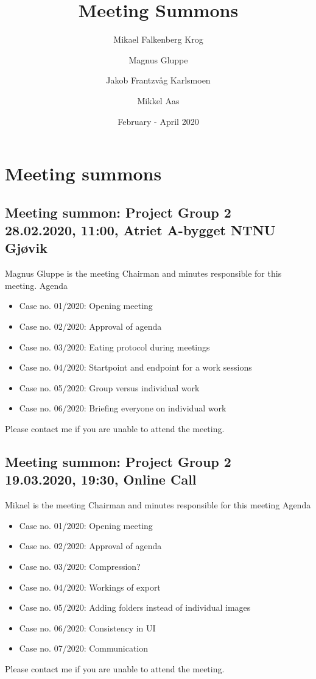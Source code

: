 \documentclass{article}
\title{Meeting Summons}
\author{Mikael Falkenberg Krog \and Magnus Gluppe \and Jakob Frantzvåg Karlsmoen \and Mikkel Aas}
\date{February - April 2020}
\begin{document}
\maketitle
\tableofcontents
\newpage
\section{Meeting summons}
\subsection[Meeting summon: Project Group 2]{Meeting summon: Project Group 2\\ {\large 28.02.2020, 11:00, Atriet A-bygget NTNU Gjøvik}}

Magnus Gluppe is the meeting Chairman and minutes responsible for this meeting.
\newline
\newline
\large Agenda 
\begin{itemize}
    \item Case no. 01/2020:  Opening meeting
    \item Case no. 02/2020:  Approval of agenda
    \item Case no. 03/2020:  Eating protocol during meetings
    \item Case no. 04/2020:  Startpoint and endpoint for a work sessions
    \item Case no. 05/2020:  Group versus individual work
    \item Case no. 06/2020:  Briefing everyone on individual work
\end{itemize}
\newline
\newline
Please contact me if you are unable to attend the meeting.
\newpage

\subsection[Meeting summon: Project Group 2]{Meeting summon: Project Group 2\\ {\large 19.03.2020, 19:30, Online Call}}

Mikael is the meeting Chairman and minutes responsible for this meeting
\newline
\newline
\large Agenda 
\begin{itemize}
    \item Case no. 01/2020:  Opening meeting
    \item Case no. 02/2020:  Approval of agenda
    \item Case no. 03/2020:  Compression?
    \item Case no. 04/2020:  Workings of export
    \item Case no. 05/2020:  Adding folders instead of individual images
    \item Case no. 06/2020:  Consistency in UI
    \item Case no. 07/2020:  Communication
\end{itemize}
\newline
\newline
Please contact me if you are unable to attend the meeting.
\newpage
\end{document}
